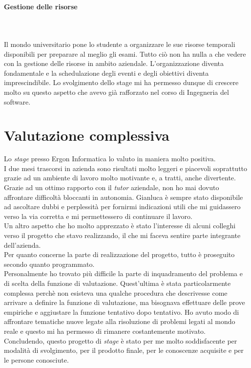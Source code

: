 \paragraph{Gestione delle risorse}\hfill\\\\
Il mondo universitario pone lo studente a organizzare le sue risorse temporali disponibili
per preparare al meglio gli esami. Tutto ciò non ha nulla a che vedere con la
gestione delle risorse in ambito aziendale. L'organizzazione diventa fondamentale
e la schedulazione degli eventi e degli obiettivi diventa imprescindibile.
Lo svolgimento dello stage mi ha permesso dunque di crescere molto su questo aspetto
che avevo già rafforzato nel corso di Ingegneria del software.

\section{Valutazione complessiva}
\noindent Lo \textit{stage} presso Ergon Informatica lo valuto in maniera molto positiva.\\
I due mesi trascorsi in azienda sono risultati molto leggeri e piacevoli soprattutto grazie
ad un ambiente di lavoro molto motivante e, a tratti, anche divertente.\\

\noindent Grazie ad un ottimo rapporto con il \textit{tutor} aziendale, non ho mai dovuto
affrontare difficoltà bloccanti in autonomia. Gianluca è sempre stato disponibile
ad ascoltare dubbi e perplessità per fornirmi indicazioni utili che mi guidassero
verso la via corretta e mi permettessero di continuare il lavoro.\\
Un altro aspetto che ho molto apprezzato è stato l'interesse di alcuni colleghi
verso il progetto che stavo realizzando, il che mi faceva sentire parte integrante
dell'azienda.\\

\noindent Per quanto concerne la parte di realizzazione del progetto, tutto è proseguito secondo quanto programmato.\\
Personalmente ho trovato più difficile la parte di inquadramento del problema e di scelta della funzione di valutazione.
Quest'ultima è stata particolarmente complessa perchè non esisteva una qualche procedura
che descrivesse come arrivare a definire la funzione di valutazione, ma bisognava
effettuare delle prove empiriche e aggiustare la funzione tentativo dopo tentativo.
Ho avuto modo di affrontare tematiche nuove legate alla risoluzione di problemi
legati al mondo reale e questo mi ha permesso di rimanere costantemente motivato.\\

\noindent Concludendo, questo progetto di \textit{stage} è stato per me
molto soddisfacente per modalità di svolgimento, per il prodotto finale, per le conoscenze acquisite e per le persone conosciute.